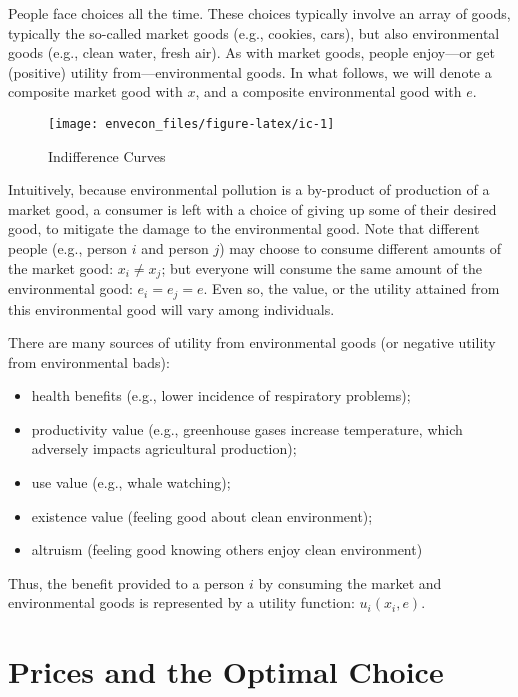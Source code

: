 \documentclass[
]{book}
\providecommand{\tightlist}{%
  \setlength{\itemsep}{0pt}\setlength{\parskip}{0pt}}
\begin{document}
People face choices all the time. These choices typically involve an array of goods, typically the so-called market goods (e.g., cookies, cars), but also environmental goods (e.g., clean water, fresh air). As with market goods, people enjoy---or get (positive) utility from---environmental goods. In what follows, we will denote a composite market good with \(x\), and a composite environmental good with \(e\).

\begin{figure}

{\centering \texttt{[image: envecon\_files/figure-latex/ic-1]} 

}

\caption{Indifference Curves}\label{fig:ic}
\end{figure}

Intuitively, because environmental pollution is a by-product of production of a market good, a consumer is left with a choice of giving up some of their desired good, to mitigate the damage to the environmental good. Note that different people (e.g., person \(i\) and person \(j\)) may choose to consume different amounts of the market good: \(x_i\neq x_j\); but everyone will consume the same amount of the environmental good: \(e_i=e_j=e\). Even so, the value, or the utility attained from this environmental good will vary among individuals.

There are many sources of utility from environmental goods (or negative utility from environmental bads):

\begin{itemize}
\tightlist
\item
  health benefits (e.g., lower incidence of respiratory problems);
\item
  productivity value (e.g., greenhouse gases increase temperature, which adversely impacts agricultural production);
\item
  use value (e.g., whale watching);
\item
  existence value (feeling good about clean environment);
\item
  altruism (feeling good knowing others enjoy clean environment)
\end{itemize}

Thus, the benefit provided to a person \(i\) by consuming the market and environmental goods is represented by a utility function: \(u_i(x_i,e)\).

\hypertarget{prices-and-the-optimal-choice}{%
\section{Prices and the Optimal Choice}\label{prices-and-the-optimal-choice}}
\end{document}
